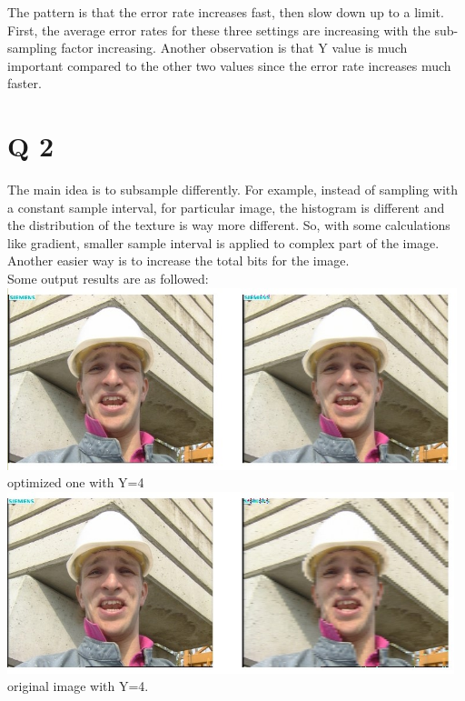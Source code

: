 \documentclass[10pt]{report}            %
\begin{document}
	The pattern is that the error rate increases fast, then slow down up to a limit.\\
	First, the average error rates for these three settings are increasing with the sub-sampling factor increasing. Another observation is that Y value is much important compared to the other two values since the error rate increases much faster.\\
  \section*{Q 2}
     The main idea is to subsample differently. For example, instead of sampling with a constant sample interval, for particular image, the histogram is different and the distribution of the texture is  way more different. So, with some calculations like gradient, smaller sample interval is applied to complex part of the image.\\
     Another easier way is to increase the total bits for the image.\\
     Some output results are as followed:\\
     \includegraphics[height=150pt]{4.jpg}
     \\optimized one with Y=4\\
      \includegraphics[height=150pt]{5.jpg}
      \\original image with Y=4.
     
\end{document}
